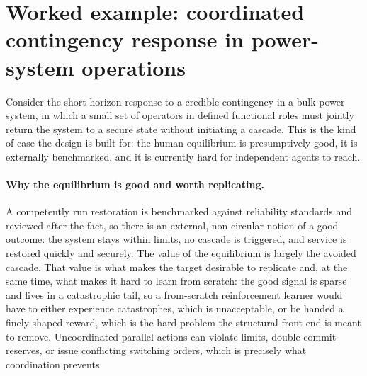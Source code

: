 \documentclass[11pt]{article}
\theoremstyle{definition}
\begin{document}
\section{Worked example: coordinated contingency response in power-system operations}

Consider the short-horizon response to a credible contingency in a bulk power system, in which a small set of operators in defined functional roles must jointly return the system to a secure state without initiating a cascade. This is the kind of case the design is built for: the human equilibrium is presumptively good, it is externally benchmarked, and it is currently hard for independent agents to reach.

\paragraph{Why the equilibrium is good and worth replicating.}
A competently run restoration is benchmarked against reliability standards and reviewed after the fact, so there is an external, non-circular notion of a good outcome: the system stays within limits, no cascade is triggered, and service is restored quickly and securely. The value of the equilibrium is largely the avoided cascade. That value is what makes the target desirable to replicate and, at the same time, what makes it hard to learn from scratch: the good signal is sparse and lives in a catastrophic tail, so a from-scratch reinforcement learner would have to either experience catastrophes, which is unacceptable, or be handed a finely shaped reward, which is the hard problem the structural front end is meant to remove. Uncoordinated parallel actions can violate limits, double-commit reserves, or issue conflicting switching orders, which is precisely what coordination prevents.
\end{document}
